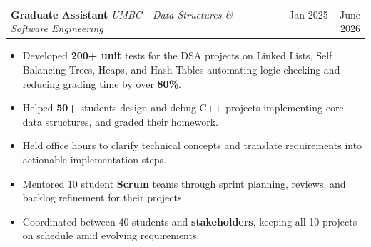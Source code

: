 \documentclass[letterpaper,11pt]{article}
\makeatletter
\newcommand{\SectionListBegin}{\begin{itemize}[leftmargin=0.15in, label={}]}
\newcommand{\BulletItems}[1]{
  \item
    \begin{itemize}[label={-}, leftmargin=*, labelsep=0.3em, topsep=0pt, partopsep=0pt, itemsep=0pt, parsep=0pt]
      \small #1
    \end{itemize}\vspace{-5pt}
}
\newcommand{\SLSubheadingItemThF}[3]{
  \vspace{-2pt}\item
    \begin{tabular*}{0.97\textwidth}[t]{l@{\extracolsep{\fill}}r}
      \textbf{#1} \textbar{} \textit{\small #2} & {\small #3} \\
    \end{tabular*}\vspace{-7pt}
}
\newcommand{\SLSubheadingItemLink}[4]{
  \vspace{-2pt}\item
    \begin{tabular*}{0.97\textwidth}[t]{l@{\extracolsep{\fill}}r}
      \textbf{\href{#2}{#1}} \textbar{} \textit{\small #3} & {\small #4} \\
    \end{tabular*}\vspace{-7pt}
}
\makeatother
\begin{document}
    \SLSubheadingItemThF
      {Graduate Assistant}
      {UMBC - Data Structures \& Software Engineering}
      {Jan 2025 -- June 2026}
    \BulletItems{
      \item Developed \textbf{200+ unit} tests for the DSA projects on Linked Lists, Self Balancing Trees, Heaps, and Hash Tables automating logic checking and reducing grading time by over \textbf{80\%}.
      \item Helped \textbf{50+} students design and debug C++ projects implementing core data structures, and graded their homework.
      \item Held office hours to clarify technical concepts and translate requirements into actionable implementation steps.
      \item Mentored 10 student \textbf{Scrum} teams through sprint planning, reviews, and backlog refinement for their projects.
      \item Coordinated between 40 students and \textbf{stakeholders}, keeping all 10 projects on schedule amid evolving requirements.
     }


      
\end{document}
